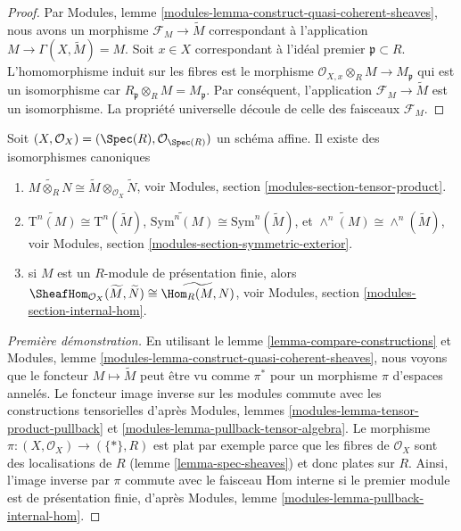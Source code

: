 \begin{proof}
Par Modules, lemme \ref{modules-lemma-construct-quasi-coherent-sheaves}, nous
avons un morphisme $\mathcal{F}_M \to \widetilde M$ correspondant à
l'application $M \to \Gamma(X, \widetilde M) = M$. Soit $x \in X$
correspondant à l'idéal premier $\mathfrak p \subset
R$. L'homomorphisme induit sur les fibres
est le morphisme $\mathcal{O}_{X, x} \otimes_R M \to
M_{\mathfrak p}$ qui est un isomorphisme
car $R_{\mathfrak p} \otimes_R M = M_{\mathfrak
p}$. Par conséquent, l'application $\mathcal{F}_M \to \widetilde M$
est un isomorphisme. La propriété universelle découle de celle
des faisceaux $\mathcal{F}_M$.
\end{proof}

\begin{lemma}
\label{lemma-widetilde-constructions}
Soit $(X, \mathcal{O}_X) = (\Spec(R), \mathcal{O}_{\Spec(R)})$ un
schéma affine. Il existe des isomorphismes canoniques
\begin{enumerate}
\item
$
\widetilde{M \otimes_R N}
\cong
\widetilde M \otimes_{\mathcal{O}_X} \widetilde N $,
voir
Modules, section \ref{modules-section-tensor-product}.
\item $
\widetilde{\text{T}^n(M)}
\cong
\text{T}^n(\widetilde
M) $,
$
\widetilde{\text{Sym}^n(M)}
\cong
\text{Sym}^n(\widetilde
M)
$, et $
\widetilde{\wedge^n(M)}
\cong
\wedge^n(\widetilde
M)
$,
voir
Modules, section \ref{modules-section-symmetric-exterior}.
\item si $M$ est un $R$-module de présentation finie, alors
$
\SheafHom_{\mathcal{O}_X}(\widetilde M, \widetilde N)
\cong
\widetilde{\Hom_R(M, N)}
$,
voir
Modules, section \ref{modules-section-internal-hom}.
\end{enumerate}
\end{lemma}

\begin{proof}[Première démonstration]
En utilisant le lemme \ref{lemma-compare-constructions}
et Modules, lemme \ref{modules-lemma-construct-quasi-coherent-sheaves}, nous
voyons que le foncteur $M \mapsto \widetilde M$ peut être vu comme
$\pi^*$ pour un morphisme $\pi$ d'espaces annelés. Le foncteur
image inverse sur les modules commute avec les constructions
tensorielles d'après Modules, lemmes \ref{modules-lemma-tensor-product-pullback}
et \ref{modules-lemma-pullback-tensor-algebra}.
Le morphisme $\pi : (X, \mathcal{O}_X) \to (\{*\}, R)$ est plat
par exemple parce que les fibres de $\mathcal{O}_X$ sont des
localisations de $R$ (lemme \ref{lemma-spec-sheaves}) et donc
plates sur $R$. Ainsi, l'image inverse par $\pi$ commute avec le
faisceau Hom interne si le premier module est de présentation finie,
d'après Modules, lemme \ref{modules-lemma-pullback-internal-hom}.
\end{proof}

